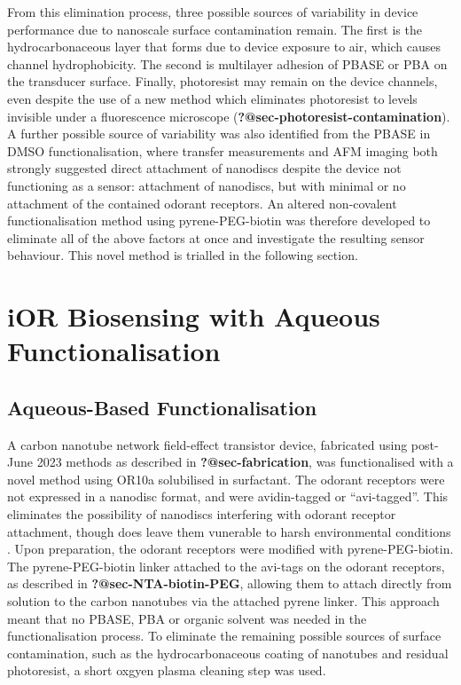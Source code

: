 \documentclass[
  a4paper,
]{scrbook}
\begin{document}
From this elimination process, three possible sources of variability in
device performance due to nanoscale surface contamination remain. The
first is the hydrocarbonaceous layer that forms due to device exposure
to air, which causes channel hydrophobicity. The second is multilayer
adhesion of PBASE or PBA on the transducer surface. Finally, photoresist
may remain on the device channels, even despite the use of a new method
which eliminates photoresist to levels invisible under a fluorescence
microscope (\textbf{?@sec-photoresist-contamination}). A further
possible source of variability was also identified from the PBASE in
DMSO functionalisation, where transfer measurements and AFM imaging both
strongly suggested direct attachment of nanodiscs despite the device not
functioning as a sensor: attachment of nanodiscs, but with minimal or no
attachment of the contained odorant receptors. An altered non-covalent
functionalisation method using pyrene-PEG-biotin was therefore developed
to eliminate all of the above factors at once and investigate the
resulting sensor behaviour. This novel method is trialled in the
following section.

\hypertarget{ior-biosensing-with-aqueous-functionalisation}{%
\section{iOR Biosensing with Aqueous
Functionalisation}\label{ior-biosensing-with-aqueous-functionalisation}}

\hypertarget{aqueous-based-functionalisation}{%
\subsection{Aqueous-Based
Functionalisation}\label{aqueous-based-functionalisation}}

A carbon nanotube network field-effect transistor device, fabricated
using post-June 2023 methods as described in \textbf{?@sec-fabrication},
was functionalised with a novel method using OR10a solubilised in
surfactant. The odorant receptors were not expressed in a nanodisc
format, and were avidin-tagged or ``avi-tagged''. This eliminates the
possibility of nanodiscs interfering with odorant receptor attachment,
though does leave them vunerable to harsh environmental conditions
\autocite{Nath2007,Bayburt2010}. Upon preparation, the odorant receptors
were modified with pyrene-PEG-biotin. The pyrene-PEG-biotin linker
attached to the avi-tags on the odorant receptors, as described in
\textbf{?@sec-NTA-biotin-PEG}, allowing them to attach directly from
solution to the carbon nanotubes via the attached pyrene linker. This
approach meant that no PBASE, PBA or organic solvent was needed in the
functionalisation process. To eliminate the remaining possible sources
of surface contamination, such as the hydrocarbonaceous coating of
nanotubes and residual photoresist, a short oxgyen plasma cleaning step
was used.
\end{document}
